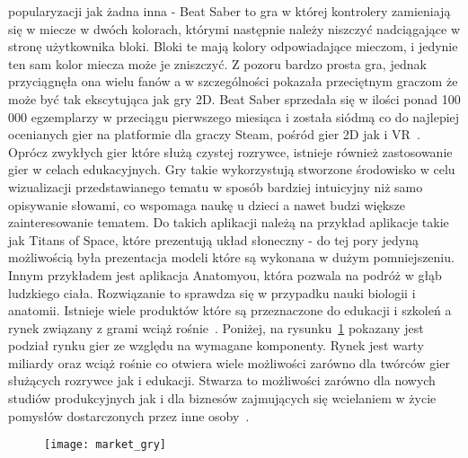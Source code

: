 popularyzacji jak żadna inna - Beat Saber to gra w której kontrolery zamieniają się w miecze w dwóch kolorach, którymi następnie należy niszczyć nadciągające w stronę użytkownika bloki. Bloki te mają kolory odpowiadające mieczom, i jedynie ten sam kolor miecza może je zniszczyć. Z pozoru bardzo prosta gra, jednak przyciągnęła ona wielu fanów a w szczególności pokazała przeciętnym graczom że może być tak ekscytująca jak gry 2D. Beat Saber sprzedała się w ilości ponad 100 000 egzemplarzy w przeciągu pierwszego miesiąca i została siódmą co do najlepiej ocenianych gier na platformie dla graczy Steam, pośród gier 2D jak i VR~\cite{gry2}. 
Oprócz zwykłych gier które służą czystej rozrywce, istnieje również zastosowanie gier w celach edukacyjnych. Gry takie wykorzystują stworzone środowisko w celu wizualizacji przedstawianego tematu w sposób bardziej intuicyjny niż samo opisywanie słowami, co wspomaga naukę u dzieci a nawet budzi większe zainteresowanie tematem. Do takich aplikacji należą na przykład aplikacje takie jak  Titans of Space, które prezentują układ słoneczny - do tej pory jedyną możliwością była prezentacja modeli które są wykonana w dużym pomniejszeniu. Innym przykładem jest aplikacja Anatomyou, która pozwala na podróż w głąb ludzkiego ciała. Rozwiązanie to sprawdza się w przypadku nauki biologii i anatomii. Istnieje wiele produktów które są przeznaczone do edukacji i szkoleń a rynek związany z grami wciąż rośnie~\cite{gry3}. Poniżej, na rysunku~\ref{fig:market_gry} pokazany jest podział rynku gier ze względu na wymagane komponenty. Rynek jest warty miliardy oraz wciąż rośnie co otwiera wiele możliwości zarówno dla twórców gier służących rozrywce jak i edukacji. Stwarza to możliwości zarówno dla nowych studiów produkcyjnych jak i dla biznesów zajmujących się wcielaniem w życie pomysłów dostarczonych przez inne osoby~\cite{gry1}.
   \begin{figure}[h]
\centering
\texttt{[image: market\_gry]}
\label{fig:market_gry}
\end{figure}